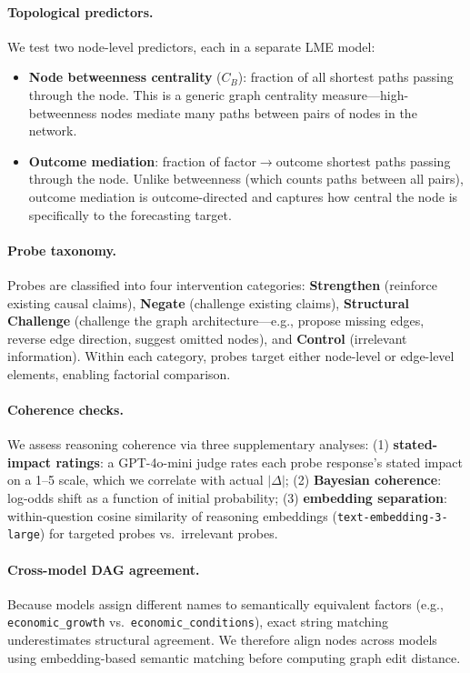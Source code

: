 \documentclass[11pt]{article}
\begin{document}
\paragraph{Topological predictors.}
We test two node-level predictors, each in a separate LME model:

\begin{itemize}
    \item \textbf{Node betweenness centrality} ($C_B$): fraction of all shortest paths passing through the node. This is a generic graph centrality measure---high-betweenness nodes mediate many paths between pairs of nodes in the network.
    \item \textbf{Outcome mediation}: fraction of factor$\rightarrow$outcome shortest paths passing through the node. Unlike betweenness (which counts paths between all pairs), outcome mediation is outcome-directed and captures how central the node is specifically to the forecasting target.
\end{itemize}

\paragraph{Probe taxonomy.}
Probes are classified into four intervention categories: \textbf{Strengthen} (reinforce existing causal claims), \textbf{Negate} (challenge existing claims), \textbf{Structural Challenge} (challenge the graph architecture---e.g., propose missing edges, reverse edge direction, suggest omitted nodes), and \textbf{Control} (irrelevant information). Within each category, probes target either node-level or edge-level elements, enabling factorial comparison.

\paragraph{Coherence checks.}
We assess reasoning coherence via three supplementary analyses: (1) \textbf{stated-impact ratings}: a GPT-4o-mini judge rates each probe response's stated impact on a 1--5 scale, which we correlate with actual $|\Delta|$; (2) \textbf{Bayesian coherence}: log-odds shift as a function of initial probability; (3) \textbf{embedding separation}: within-question cosine similarity of reasoning embeddings (\texttt{text-embedding-3-large}) for targeted probes vs.\ irrelevant probes.

\paragraph{Cross-model DAG agreement.}
Because models assign different names to semantically equivalent factors (e.g., \texttt{economic\_growth} vs.\ \texttt{economic\_conditions}), exact string matching underestimates structural agreement. We therefore align nodes across models using embedding-based semantic matching before computing graph edit distance.
\end{document}
